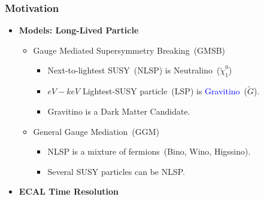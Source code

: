 \documentclass{beamer}
\begin{document}
\begin{frame}
\frametitle{Motivation}
\begin{minipage}{0.8\paperwidth} 
     \begin{itemize}  
       \item{\color{UMN@Maroon} \textbf{Models: Long-Lived Particle}}
      \large{
        \begin{itemize}
        \item Gauge Mediated Supersymmetry Breaking~(GMSB)
          \begin{itemize}
            \item Next-to-lightest SUSY~(NLSP) is \alert{Neutralino}~($\tilde{\chi}^{0}_{1}$)
            \item $eV-keV$ Lightest-SUSY particle~(LSP) is \textcolor{blue}{Gravitino}~($\tilde{G}$).
            \item Gravitino is a Dark Matter Candidate.
          \end{itemize}
        \item General Gauge Mediation~(GGM)
          \begin{itemize}
            \item NLSP is a mixture of fermions~(Bino, Wino, Higssino).
            \item Several SUSY particles can be NLSP.
          \end{itemize}
      \end{itemize}
    }   
  \item{ \color{UMN@Maroon} \textbf{ECAL Time Resolution}}    


\end{itemize}
\end{minipage}
\end{frame}
\end{document}
